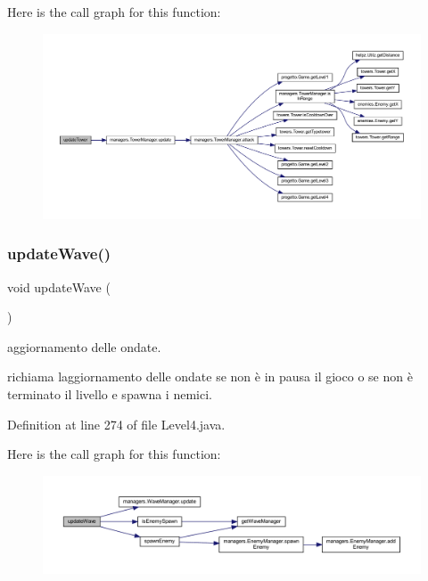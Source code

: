 Here is the call graph for this function\+:\nopagebreak
\begin{figure}[H]
\begin{center}
\leavevmode
\includegraphics[width=350pt]{classscenes_1_1_level4_ae4fd4a959e4d782a5e7ac0eff77ba27f_cgraph}
\end{center}
\end{figure}
\mbox{\label{classscenes_1_1_level4_ab424ab29e7ab4733f2efd1e6ef3f13b1}} 
\subsubsection{\texorpdfstring{update\+Wave()}{updateWave()}}
{\footnotesize\ttfamily void update\+Wave (\begin{DoxyParamCaption}{ }\end{DoxyParamCaption})}



aggiornamento delle ondate. 

richiama l\textquotesingle{}aggiornamento delle ondate se non è in pausa il gioco o se non è terminato il livello e spawna i nemici. 

Definition at line 274 of file Level4.\+java.

Here is the call graph for this function\+:\nopagebreak
\begin{figure}[H]
\begin{center}
\leavevmode
\includegraphics[width=350pt]{classscenes_1_1_level4_ab424ab29e7ab4733f2efd1e6ef3f13b1_cgraph}
\end{center}
\end{figure}


